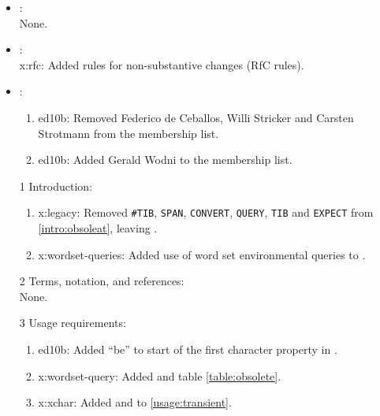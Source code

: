 	\begin{itemize}
	\item {}: \\
		None.

	\item {}: \\
		\textsf{x:rfc}: Added rules for non-substantive changes (RfC rules).

	\item {}:
		\begin{enumerate}
		\item \textsf{ed10b}: Removed Federico de Ceballos, Willi Stricker
			and Carsten Strotmann from the \linebreak membership list.
		\item \textsf{ed10b}: Added Gerald Wodni to the membership list.
		\end{enumerate}

	\item[1] Introduction:
		\begin{enumerate}
		\item \textsf{x:legacy}: Removed \texttt{\#TIB}, \texttt{SPAN},
			\texttt{CONVERT}, \texttt{QUERY}, \texttt{TIB} and \texttt{EXPECT}
			from \ref{intro:obsoleat}, leaving .

		\item \textsf{x:wordset-queries}: Added use of word set environmental
			queries to .
		\end{enumerate}

	\item[2] Terms, notation, and references: \\
		None.

	\item[3] Usage requirements:
		\begin{enumerate}
		\item \textsf{ed10b}: Added ``be'' to start of the first character
			property in .
		\item \textsf{x:wordset-query}: Added  and table
			\ref{table:obsolete}.
		\item \textsf{x:xchar}: Added  and  to
			\ref{usage:transient}.
		\end{enumerate}


\end{itemize}
